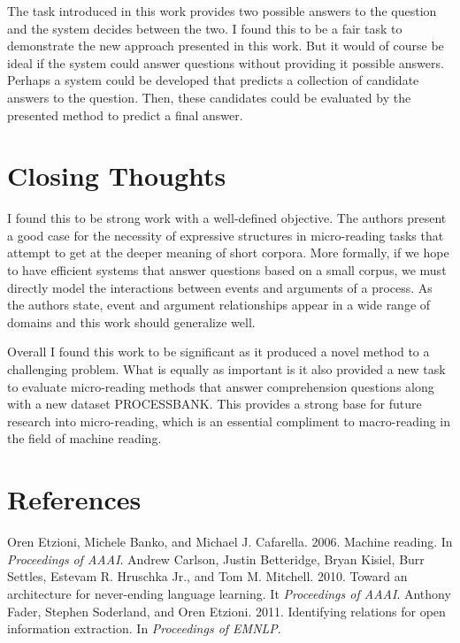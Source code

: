 \documentclass[fleqn,11pt]{wlpeerj} %
\begin{document}
The task introduced in this work provides two possible answers to the question and the system decides between the two. I found this to be a fair task to demonstrate the new approach presented in this work. But it would of course be ideal if the system could answer questions without providing it possible answers. Perhaps a system could be developed that predicts a collection of candidate answers to the question. Then, these candidates could be evaluated by the presented method to predict a final answer.


\section*{Closing Thoughts}
I found this to be strong work with a well-defined objective. The authors present a good case for the necessity of expressive structures in micro-reading tasks that attempt to get at the deeper meaning of short corpora. More formally, if we hope to have efficient systems that answer questions based on a small corpus, we must directly model the interactions between events and arguments of a process. As the authors state, event and argument relationships appear in a wide range of domains and this work should generalize well. 

Overall I found this work to be significant as it produced a novel method to a challenging problem. What is equally as important is it also provided a new task to evaluate micro-reading methods that answer comprehension questions along with a new dataset PROCESSBANK. This provides a strong base for future research into micro-reading, which is an essential compliment to macro-reading in the field of machine reading.
\newpage

\section*{References}
Oren Etzioni, Michele Banko, and Michael J. Cafarella. 2006. Machine reading. In \textit{Proceedings} \hspace*{1em} \textit{of AAAI}. \newline \newline
Andrew Carlson, Justin Betteridge, Bryan Kisiel, Burr Settles, Estevam R. Hruschka Jr., and \hspace*{1em} Tom M. Mitchell. 2010. Toward an architecture for never-ending language learning. It \hspace*{1em} \textit{Proceedings of AAAI}. \newline \newline
Anthony Fader, Stephen Soderland, and Oren Etzioni. 2011. Identifying relations for open \hspace*{1em} information extraction. In \textit{Proceedings of EMNLP}.
\end{document}

